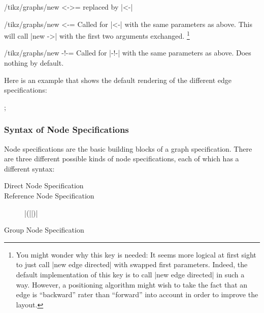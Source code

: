 \begin{enumerate}
\begin{key}{/tikz/graphs/new <->=}
    replaced by |<-|
  \end{key}
  \begin{key}{/tikz/graphs/new <-=}
    Called for |<-| with the same parameters as above. This will call
    |new ->| with the first two arguments exchanged.%
    \footnote{You might
      wonder why this key is needed: It seems more logical at first
      sight to just call |new edge directed| with swapped first
      parameters. Indeed, the default implementation of this key is to
      call |new edge directed| in such a way. However, a positioning
      algorithm might wish to take the fact that an edge is
      ``backward'' rater than ``forward'' into account in order to
      improve the layout.}
  \end{key}
  \begin{key}{/tikz/graphs/new -!-=}
    Called for |-!-| with the same parameters as above. Does nothing
    by default.
  \end{key}
\end{enumerate}

Here is an example that shows the default rendering of the different
edge specifications:

\begin{codeexample}[]
\tikz {};  
\end{codeexample}


\subsubsection{Syntax of Node Specifications}

\label{section-library-graphs-node-spec}

Node specifications are the basic building blocks of a graph
specification. There are three different possible kinds of node
specifications, each of which has a different syntax: 

\begin{description}
\item[Direct Node Specification]  
\item[Reference Node Specification] |(||)|
\item[Group Node Specification] 
\end{description}

